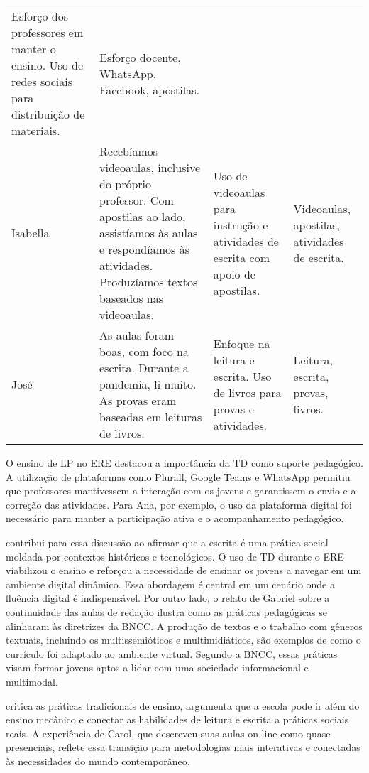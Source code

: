 \documentclass[portuguese]{textolivre}
\begin{document}
\begin{table}[htbp]
\begin{small}
\begin{tabular}{p{} >{\raggedright\arraybackslash}p{4.5cm} >{\raggedright\arraybackslash}p{4cm} >{\raggedright\arraybackslash}p{3cm}}
Esforço dos professores em manter o ensino. Uso de redes sociais para
distribuição de materiais. & Esforço docente, WhatsApp, Facebook,
apostilas. \\
Isabella & Recebíamos videoaulas, inclusive do próprio professor. Com
apostilas ao lado, assistíamos às aulas e respondíamos às atividades.
Produzíamos textos baseados nas videoaulas. & Uso de videoaulas para
instrução e atividades de escrita com apoio de apostilas. & Videoaulas,
apostilas, atividades de escrita. \\
José & As aulas foram boas, com foco na escrita. Durante a pandemia, li
muito. As provas eram baseadas em leituras de livros. & Enfoque na
leitura e escrita. Uso de livros para provas e atividades. & Leitura,
escrita, provas, livros. \\
\bottomrule
\end{tabular}
\end{small}
\end{table}


O ensino de LP no ERE destacou a importância da TD como suporte pedagógico. A utilização de plataformas como Plurall, Google Teams e WhatsApp permitiu que professores mantivessem a interação com os jovens e garantissem o envio e a correção das atividades. Para Ana, por exemplo, o uso da plataforma digital foi necessário para manter a participação ativa e o acompanhamento pedagógico.

\textcite{ribeiro2018} contribui para essa discussão ao afirmar que a escrita é uma prática social moldada por contextos históricos e tecnológicos. O uso de TD durante o ERE viabilizou o ensino e reforçou a necessidade de ensinar os jovens a navegar em um ambiente digital dinâmico. Essa abordagem é central em um cenário onde a fluência digital é indispensável.
Por outro lado, o relato de Gabriel sobre a continuidade das aulas de redação ilustra como as práticas pedagógicas se alinharam às diretrizes da BNCC. A produção de textos e o trabalho com gêneros textuais, incluindo os multissemióticos e multimidiáticos, são exemplos de como o currículo foi adaptado ao ambiente virtual. Segundo a BNCC, essas práticas visam formar jovens aptos a lidar com uma sociedade informacional e multimodal.

\textcite{soares2002} critica as práticas tradicionais de ensino, argumenta que a escola pode ir além do ensino mecânico e conectar as habilidades de leitura e escrita a práticas sociais reais. A experiência de Carol, que descreveu suas aulas on-line como quase presenciais, reflete essa transição para metodologias mais interativas e conectadas às necessidades do mundo contemporâneo.
\end{document}
